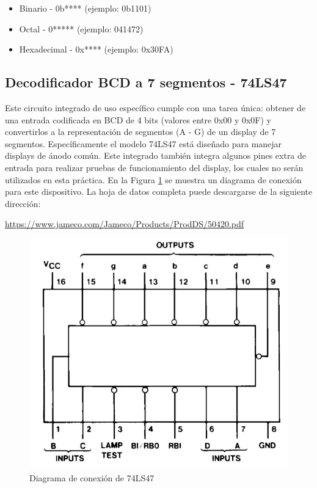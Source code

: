 \begin{itemize}
    \item Binario     - 0b**** (ejemplo: 0b1101)
    \item Octal       - 0***** (ejemplo: 041472)
    \item Hexadecimal - 0x**** (ejemplo: 0x30FA)
\end{itemize}

\subsection{Decodificador BCD a 7 segmentos - 74LS47}
Este circuito integrado de uso específico cumple con una tarea única: obtener de una entrada codificada en BCD de 4 bits
(valores entre 0x00 y 0x0F) y convertirlos a la representación de segmentos (A - G) de un display de 7 segmentos. Específicamente
el modelo 74LS47 está diseñado para manejar displays de ánodo común. Este integrado también integra algunos pines extra de entrada para
realizar pruebas de funcionamiento del display, los cuales no serán utilizados en esta práctica. En la Figura \ref{Fig:74LS47} se muestra
un diagrama de conexión para este dispositivo. La hoja de datos completa puede descargarse de la siguiente dirección:

\begin{center}
    \url{https://www.jameco.com/Jameco/Products/ProdDS/50420.pdf}    
\end{center}


\begin{figure}[H]
    \centering
    \includegraphics[scale=0.5]{images/74LS47.JPG}
    \caption{Diagrama de conexión de 74LS47}
    \label{Fig:74LS47}
\end{figure}



